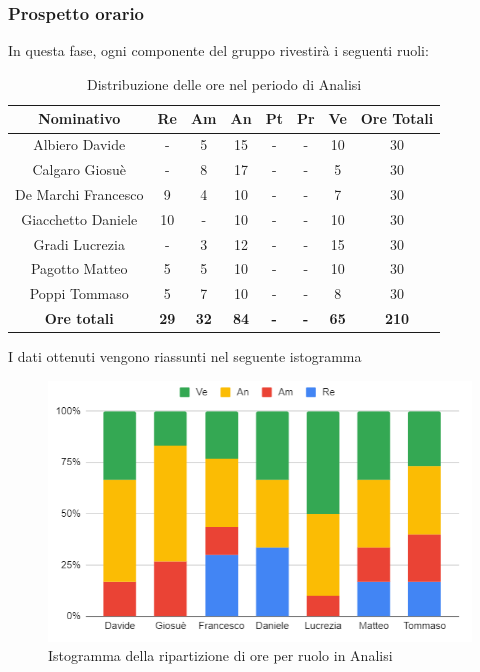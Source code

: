 \subsubsection{Prospetto orario}
In questa fase, ogni componente del gruppo rivestirà i seguenti ruoli:
\begin{table}[H]
		\begin{center}
			\setlength{\aboverulesep}{0pt}
			\setlength{\belowrulesep}{0pt}
			\setlength{\extrarowheight}{.75ex}
			\begin{tabular}{ c c c c c c c c }
				\rowcolor{AzzurroGruppo!30} 
				\textbf{Nominativo} & \textbf{Re} & \textbf{Am} & \textbf{An} & \textbf{Pt} & \textbf{Pr} & \textbf{Ve} & \textbf{Ore Totali}  \\
				\toprule
				Albiero Davide      & -  & 5  & 15 & - & - & 10 & 30 \\
				Calgaro Giosuè      & -  & 8  & 17 & - & - & 5  & 30 \\
				De Marchi Francesco & 9  & 4  & 10 & - & - & 7  & 30\\
				Giacchetto Daniele  & 10 & -  & 10 & - & - & 10 & 30\\
				Gradi Lucrezia      & -  & 3 & 12 & - & - & 15 & 30\\
				Pagotto Matteo      & 5  & 5  & 10 & - & - & 10 & 30\\
				Poppi Tommaso       & 5  & 7  & 10 & - & - & 8  & 30\\
				 \textbf{Ore totali} & \textbf{29} & \textbf{32} & \textbf{84} & \textbf{-} & \textbf{-} & \textbf{65} & \textbf{210} \\
				\bottomrule
			\end{tabular}
			\caption{Distribuzione delle ore nel periodo di Analisi}
		\end{center}
	\end{table}
I dati ottenuti vengono riassunti nel seguente istogramma
\begin{figure}[H]
    \centering
    \includegraphics[scale = 0.5]{components/img/Analisi_isto.png}
    \caption{ Istogramma della ripartizione di ore per ruolo in Analisi}
    \label{fig:logo}
\end{figure}
